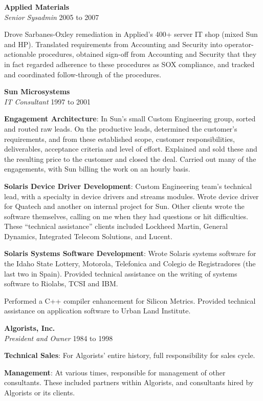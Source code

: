 \documentclass[12pt,margin,line]{res}
\newcommand{\internalskip}{\vspace{-.15in}}
\begin{document}
\begin{resume}
{\bf Applied Materials} \\
{\em Senior Sysadmin} \hfill 2005 to 2007

\internalskip
Drove Sarbanes-Oxley remediation in Applied's 400+ server IT shop
(mixed Sun and HP).
Translated requirements from Accounting and Security into operator-actionable
procedures, obtained sign-off from Accounting and Security that they in
fact regarded adherence to these procedures as SOX compliance, and tracked
and coordinated follow-through of the procedures.

{\bf Sun Microsystems} \\
{\em IT Consultant} \hfill 1997 to 2001

\internalskip
{\bf\footnotesize Engagement Architecture}:
In Sun's small Custom Engineering group, sorted and routed raw leads.
On the productive leads, determined the customer's requirements, and from
these established scope, customer responsibilities, deliverables, acceptance
criteria and level of effort.
Explained and sold these and the resulting price to the customer and closed
the deal.
Carried out many of the engagements, with Sun billing the work on an hourly
basis.

\internalskip
{\bf\footnotesize Solaris Device Driver Development}:
Custom Engineering team's technical lead, with a specialty in device drivers
and streams modules.
Wrote device driver for Quatech and another on internal project for Sun.
Other clients wrote the software themselves, calling on me when they had
questions or hit difficulties.
These ``technical assistance''
clients included Lockheed Martin, General Dynamics, Integrated Telecom
Solutions, and Lucent.

\internalskip
{\footnotesize\bf Solaris Systems Software Development}:
Wrote Solaris systems software for the Idaho State Lottery, Motorola,
Telefonica and Colegio de Registradores (the last two in Spain).
Provided technical assistance on the writing of systems software to Riolabs,
TCSI and IBM.

\internalskip
Performed a C++ compiler enhancement for Silicon Metrics.
Provided technical assistance on application software to Urban Land Institute.

{\bf Algorists, Inc.} \\
{\em President and Owner} \hfill 1984 to 1998

\internalskip
{\footnotesize\bf Technical Sales}:
For Algorists' entire history, full responsibility for sales cycle.

\internalskip
{\footnotesize\bf Management}:
At various times, responsible for management of other consultants.
These included partners within Algorists, and consultants hired by Algorists
or its clients.


\end{resume}
\end{document}
